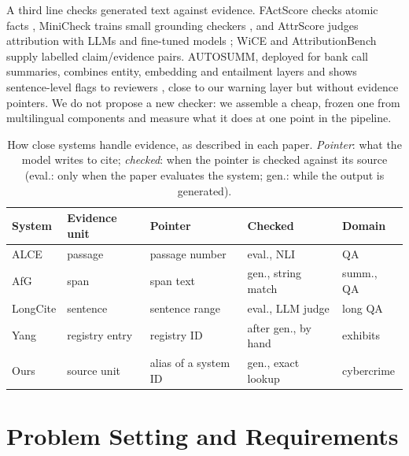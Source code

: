 \documentclass[runningheads]{llncs}
\begin{document}
A third line checks generated text against evidence. FActScore checks atomic facts
\cite{min2023factscore},
MiniCheck trains small grounding checkers \cite{tang2024minicheck}, and AttrScore judges attribution
with LLMs and fine-tuned models \cite{yue2023attrscore}; WiCE \cite{kamoi2023wice} and
AttributionBench \cite{li2024attributionbench} supply labelled claim/evidence pairs. AUTOSUMM, deployed for bank call summaries, combines entity, embedding and entailment layers and
shows sentence-level flags to reviewers \cite{gupta2025autosumm}, close to our warning layer but without
evidence pointers. We do not propose a new checker: we
assemble a cheap, frozen one from multilingual components \cite{reimers2020multilingual} and measure
what it does at one point in the pipeline.



\begin{table}[t]
\centering
\caption{How close systems handle evidence, as described in each paper. \emph{Pointer}: what the
model writes to cite; \emph{checked}: when the pointer is checked against its source (eval.: only when
the paper evaluates the system; gen.: while the output is generated).}
\label{tab:compare}
\scriptsize
\setlength{\tabcolsep}{4pt}
\begin{tabular}{@{}lllll@{}}
\toprule
System & Evidence unit & Pointer & Checked & Domain \\
\midrule
ALCE \cite{gao2023alce} & passage & passage number & eval., NLI & QA \\
AfG \cite{slobodkin2024afg} & span & span text & gen., string match & summ., QA \\
LongCite \cite{zhang2025longcite} & sentence & sentence range & eval., LLM judge & long QA \\
Yang \cite{yang2026traceable} & registry entry & registry ID & after gen., by hand & exhibits \\
Ours & source unit & alias of a system ID & gen., exact lookup & cybercrime \\
\bottomrule
\end{tabular}
\end{table}

\section{Problem Setting and Requirements}\label{sec:problem}
\end{document}
